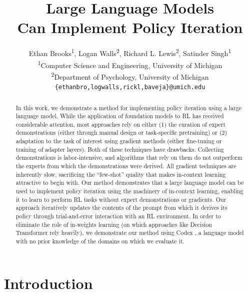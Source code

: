 \documentclass{article}
\title{Large Language Models \\ Can Implement Policy Iteration}
\author{%
Ethan Brooks\textsuperscript{\rm 1},
Logan Walls\textsuperscript{\rm 2}, 
Richard L. Lewis\textsuperscript{\rm 2}, 
Satinder Singh\textsuperscript{\rm 1} \\
\textsuperscript{\rm 1}Computer Science and Engineering, University
of Michigan \\
\textsuperscript{\rm 2}Department of Psychology, University of Michigan \\
\texttt{\{ethanbro,logwalls,rickl,baveja\}@umich.edu} \\
}
\begin{document}
\maketitle


\begin{abstract}
  In this work, we demonstrate a method for implementing policy iteration using
  a large language model. While the application of foundation models to RL has
  received considerable attention, most approaches rely on either (1) the
  curation of expert demonstrations (either through manual design or
  task-specific pretraining) or (2) adaptation to the task of interest using
  gradient methods (either fine-tuning or training of adapter layers). Both of
  these techniques have drawbacks. Collecting demonstrations is labor-intensive,
  and algorithms that rely on them do not outperform the experts from which the
  demonstrations were derived. All gradient techniques are inherently slow,
  sacrificing the “few-shot” quality that makes in-context learning attractive
  to begin with. Our method demonstrates that a large language model can be used
  to implement policy iteration using the machinery of in-context learning,
  enabling it to learn to perform RL tasks without expert demonstrations or
  gradients. Our approach iteratively updates the contents of the prompt from
  which it derives its policy through trial-and-error interaction with an RL
  environment. In order to eliminate the role of in-weights learning (on which
  approaches like Decision Transformer rely heavily), we demonstrate our
  method using Codex \parencite{chen2021evaluating}, a language model with no
  prior knowledge of the domains on which we evaluate it.
\end{abstract}


\section{Introduction}
\end{document}
